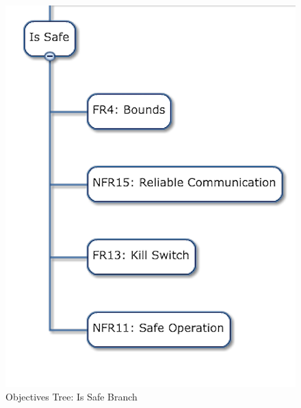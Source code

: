 \begin{figure}[!ht]
\centering
\includegraphics[width=0.98\columnwidth]{figs/objectives_tree/objectives_tree_safe.png}
\caption{Objectives Tree: Is Safe Branch}
\label{fig:obj_tree_safe} 
\end{figure}

